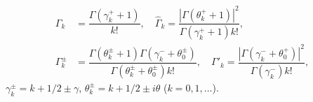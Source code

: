 \begin{equation} \label{Ostryk_Eq_24_} 
\begin{aligned}
	\Gamma _{k} &=\dfrac{\Gamma (\gamma _{k}^{+} +1)}{k!} ,\quad  \hat{\Gamma }_{k} =\dfrac{\left|\Gamma (\theta _{k}^{+} +1)\right|^{2} }{\Gamma (\gamma _{k}^{+} +1)k!} ,  
	\\
	\Gamma _{k}^{\pm }& =\dfrac{\Gamma (\theta _{k}^{\pm } +1)\Gamma (\gamma _{k}^{-} +\theta _{0}^{\pm } )}{\Gamma (\theta _{k}^{\pm } +\theta _{0}^{\pm } )k!} ,\quad  \Gamma '_{k} =\dfrac{\left|\Gamma (\gamma _{k}^{-} +\theta _{0}^{+} )\right|^{2} }{\Gamma (\gamma _{k}^{-} )k!} ,
\end{aligned}
\end{equation} 
$\gamma _{k}^{\pm } =k+1/2 \pm \gamma $,    $\theta _{k}^{\pm } =k+1/2 \pm i\theta$   ($k=0,1,\dots$).  

